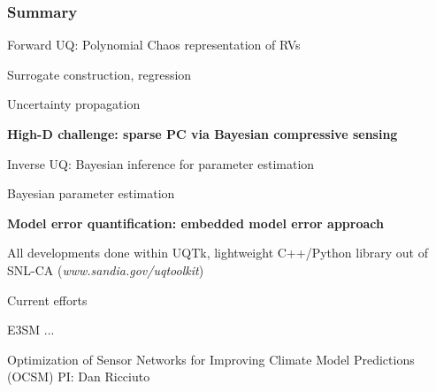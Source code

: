 \begin{frame}[t]
\label{closure}
\frametitle{Summary}

\bi
\item Forward UQ: Polynomial Chaos representation of RVs
\bi
\item Surrogate construction, regression
\item Uncertainty propagation
\item \textbf{High-D challenge: sparse PC via Bayesian compressive sensing}
\ei
\medskip
\item Inverse UQ: Bayesian inference for parameter estimation
\bi
\item Bayesian parameter estimation
\item \textbf{Model error quantification: embedded model error approach}
\ei
\medskip
\item All developments done within UQTk, lightweight C++/Python library out of SNL-CA (\emph{www.sandia.gov/uqtoolkit})\\

\item Current efforts
\bi
\item E3SM ...
\item Optimization of Sensor Networks for Improving Climate Model Predictions (OCSM) PI: Dan Ricciuto
\ei
\ei
\end{frame}
